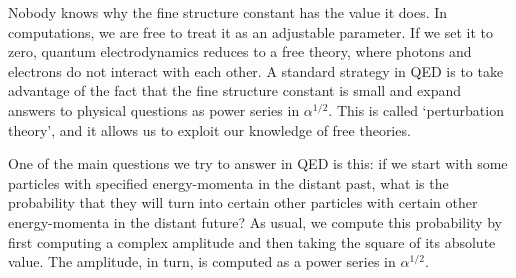\documentclass{article}
\begin{document}
Nobody knows why the fine structure constant has the value it does.  In computations, we are free to treat it as an adjustable parameter.  If we set it to zero, quantum electrodynamics reduces to a free theory, where photons and electrons do not interact with each other.  A standard strategy in QED is to take advantage of the fact that the fine structure constant is small and expand answers to physical questions as power series in $\alpha^{1/2}$.  This is called `perturbation theory', and it allows us to exploit our knowledge of free theories. 

One of the main questions we try to answer in QED is this: if we start with some particles with specified energy-momenta in the distant past, what is the probability that they will turn into certain other particles with certain other energy-momenta in the distant future?   As usual, we compute this probability by first computing a complex amplitude and then taking the square of its absolute value.  The amplitude, in turn, is computed as a power series in $\alpha^{1/2}$.  
\end{document}
